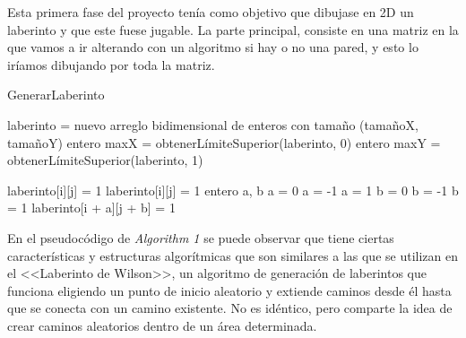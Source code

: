 Esta primera fase del proyecto tenía como objetivo que dibujase en 2D un laberinto y que este fuese jugable.
La parte principal, consiste en una matriz en la que vamos a ir alterando con un algoritmo si hay o no una pared, y esto lo iríamos dibujando por toda la matriz. 

\begin{algorithm}
\caption{GenerarLaberinto}
\begin{algorithmic}
    \State laberinto = nuevo arreglo bidimensional de enteros con tamaño (tamañoX, tamañoY)
    \State entero maxX = obtenerLímiteSuperior(laberinto, 0)
    \State entero maxY = obtenerLímiteSuperior(laberinto, 1)
    
                \State laberinto[i][j] = 1
            \Else
                        \State laberinto[i][j] = 1
                        \State entero a, b
                            \State a = 0
                        \Else
                                \State a = -1
                            \Else
                                \State a = 1
                            \EndIf
                        \EndIf
                            \State b = 0
                            \State b = -1
                        \Else
                            \State b = 1
                        \EndIf
                        \State laberinto[i + a][j + b] = 1
                    \EndIf
                \EndIf
            \EndIf
        \EndFor
    \EndFor
\EndProcedure
\end{algorithmic}
\end{algorithm}

En el pseudocódigo de \emph{Algorithm 1} se puede observar que tiene ciertas características y estructuras algorítmicas que son similares a las que se utilizan en el <<Laberinto de Wilson>>, un algoritmo de generación de laberintos que funciona eligiendo un punto de inicio aleatorio y extiende caminos desde él hasta que se conecta con un camino existente. No es idéntico, pero comparte la idea de crear caminos aleatorios dentro de un área determinada.

